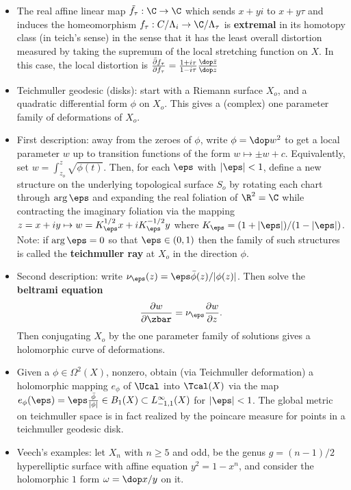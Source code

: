 \documentclass[11pt]{amsart}
\begin{document}
	\begin{itemize}
		\item The real affine linear map $\tilde{f_\tau}:\C \to \C$ which sends $x+yi$ to $x+y\tau$ and induces the homeomorphism $f_\tau: C/\Lambda_i \to \C/\Lambda_\tau$ is \textbf{extremal} in its homotopy class (in teich's sense) in the sense that it has the least overall distortion measured by taking the supremum of the local stretching function on $X$. In this case, the local distortion is $\frac{\bar{\partial} f_\tau}{\partial f_\tau} = \frac{1+i\tau}{1-i\tau} \frac{\dop \bar{z}}{\dop z}$
		\item Teichmuller geodesic (disks): start with a Riemann surface $X_o$, and a quadratic differential form $\phi$ on $X_o$. This gives a (complex) one parameter family of deformations of $X_o$. 
		\item First description: away from the zeroes of $\phi$, write $\phi=\dop w^2$ to get a local parameter $w$ up to transition functions of the form $w \mapsto \pm w +c$. Equivalently, set $w= \int_{z_o}^z \sqrt{\phi(t)}$. Then, for each $\eps$ with $\abs{\eps}<1$, define a new structure on the underlying topological surface $S_o$ by rotating each chart through $\arg\eps$ and expanding the real foliation of $\R^2 =\C$ while contracting the imaginary foliation via the mapping $z=x+iy \mapsto w= K_\eps^{1/2} x+iK_\eps ^{-1/2} y$ where $K_\eps = (1+\abs{\eps})/(1-\abs{\eps})$. Note: if $\arg\eps=0$ so that $\eps \in (0,1)$ then the family of such structures is called the \textbf{teichmuller ray} at $X_o$ in the direction $\phi$. 
		\item Second description: write $\nu_\eps(z)=\eps \bar{\phi}(z)/\abs{\phi(z)}$. Then solve the \textbf{beltrami equation} 
			\begin{equation*}
				\frac{\partial w}{\partial \zbar} = \nu_\eps \frac{\partial w}{\partial z}.
  			\end{equation*}
  		Then conjugating $X_o$ by the one parameter family of solutions gives a holomorphic curve of deformations.
  		\item Given a $\phi \in \Omega^2(X)$, nonzero, obtain (via Teichmuller deformation) a holomorphic mapping $e_\phi$ of $\Ucal$ into $\Tcal (X)$ via the map $e_\phi(\eps) = \eps \frac{\bar{\phi}}{\abs{\phi}} \in B_1(X) \subset L_{-1,1}^\infty(X)$ for $\abs{\eps}<1$. The global metric on teichmuller space is in fact realized by the poincare measure for points in a teichmuller geodesic disk. 
  		\item Veech's examples: let $X_n$ with $n\geq 5$ and odd, be the genus $g=(n-1)/2$ hyperelliptic surface with affine equation $y^2=1-x^n$, and consider the holomorphic $1$ form $\omega= \dop x/y$ on it. 

\end{itemize}
\end{document}
